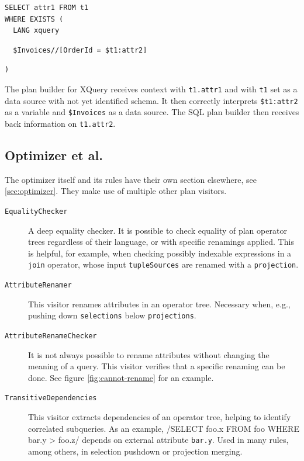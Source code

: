 \begin{listing}[!ht]
\begin{verbatim}
SELECT attr1 FROM t1
WHERE EXISTS (
  LANG xquery
\end{verbatim}
\nestedMintedVspace
\begin{verbatim}
  $Invoices//[OrderId = $t1:attr2]
\end{verbatim}
\nestedMintedVspace
\begin{verbatim}
)
\end{verbatim}
\caption{The plan builder for XQuery receives context with \texttt{t1.attr1} and with \texttt{t1} set as a data source with not yet identified schema. It then correctly interprets \texttt{\$t1:attr2} as a variable and \texttt{\$Invoices} as a data source. The SQL plan builder then receives back information on \texttt{t1.attr2}.}
\label{fig:plan-builder-outer-ctx}
\end{listing}

\subsection{Optimizer et al.}

The optimizer itself and its rules have their own section elsewhere, see \ref{sec:optimizer}. They make use of multiple other plan visitors.

\begin{description}
    \item[\texttt{EqualityChecker}] A deep equality checker. It is possible to check equality of plan operator trees regardless of their language, or with specific renamings applied. This is helpful, for example, when checking possibly indexable expressions in a \texttt{join} operator, whose input \texttt{tupleSources} are renamed with a \texttt{projection}.
    \item[\texttt{AttributeRenamer}] This visitor renames attributes in an operator tree. Necessary when, e.g., pushing down \texttt{selections} below \texttt{projections}.
    \item[\texttt{AttributeRenameChecker}] It is not always possible to rename attributes without changing the meaning of a query. This visitor verifies that a specific renaming can be done. See figure \ref{fig:cannot-rename} for an example.
    \item[\texttt{TransitiveDependencies}] This visitor extracts dependencies of an operator tree, helping to identify correlated subqueries. As an example, /SELECT foo.x FROM foo WHERE bar.y > foo.z/ depends on external attribute \texttt{bar.y}. Used in many rules, among others, in selection pushdown or projection merging.
\end{description}

